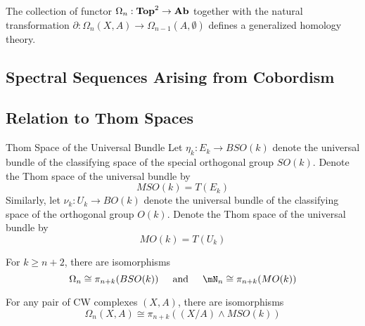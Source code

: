 \documentclass[a4paper]{article}
\begin{document}
\begin{thm}{}{} The collection of functor $\Omega_n:\bold{Top}^2\to\bold{Ab}$ together with the natural transformation $\partial:\Omega_n(X,A)\to\Omega_{n-1}(A,\emptyset)$ defines a generalized homology theory. 
\end{thm}

\subsection{Spectral Sequences Arising from Cobordism}

\subsection{Relation to Thom Spaces}
\begin{defn}{Thom Space of the Universal Bundle}{} Let $\eta_k:E_k\to BSO(k)$ denote the universal bundle of the classifying space of the special orthogonal group $SO(k)$. Denote the Thom space of the universal bundle by $$MSO(k)=T(E_k)$$ Similarly, let $\nu_k:U_k\to BO(k)$ denote the universal bundle of the classifying space of the orthogonal group $O(k)$. Denote the Thom space of the universal bundle by $$MO(k)=T(U_k)$$
\end{defn}

\begin{thm}{}{} For $k\geq n+2$, there are isomorphisms $$\Omega_n\cong\pi_{n+k}(BSO(k))\;\;\;\;\text{ and }\;\;\;\;\mN_n\cong\pi_{n+k}(MO(k))$$
\end{thm}

\begin{thm}{}{} For any pair of CW complexes $(X,A)$, there are isomorphisms $$\Omega_n(X,A)\cong\pi_{n+k}((X/A)\wedge MSO(k))$$
\end{thm}
\end{document}

